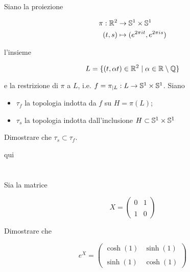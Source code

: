 \begin{tcolorbox}
	Siano la proiezione
	
	\begin{align}
		\begin{split}
			\pi : \R^{2} &\to \S^{1} \times \S^{1}\\
			(t,s) &\mapsto (e^{2 \pi i t},e^{2 \pi i s})
		\end{split}
	\end{align}

	l'insieme
	
	\begin{equation}
		L = \{ (t,\alpha t) \in \R^{2} \mid \alpha \in \R \setminus \Q \}
	\end{equation}

	e la restrizione di $ \pi $ a $ L $, i.e. $ f = \pi_{|L} : L \to \S^{1} \times \S^{1} $. Siano
	
	\begin{itemize}
		\item $ \tau_{f} $ la topologia indotta da $ f $ su $ H = \pi(L) $;
		
		\item $ \tau_{s} $ la topologia indotta dall'inclusione $ H \subset \S^{1} \times \S^{1} $
	\end{itemize}

	Dimostrare che $ \tau_{s} \subset \tau_{f} $.
\end{tcolorbox}

qui

\tocless\section{}\label{es3-3}

\begin{tcolorbox}
	Sia la matrice
	
	\begin{equation}
		X = \begin{pmatrix} 0 & 1 \\\\ 1 & 0 \end{pmatrix}
	\end{equation}

	Dimostrare che
	
	\begin{equation}
		e^{X} = \begin{pmatrix} \cosh(1) & \sinh(1) \\\\ \sinh(1) & \cosh(1) \end{pmatrix}
	\end{equation}
\end{tcolorbox}


